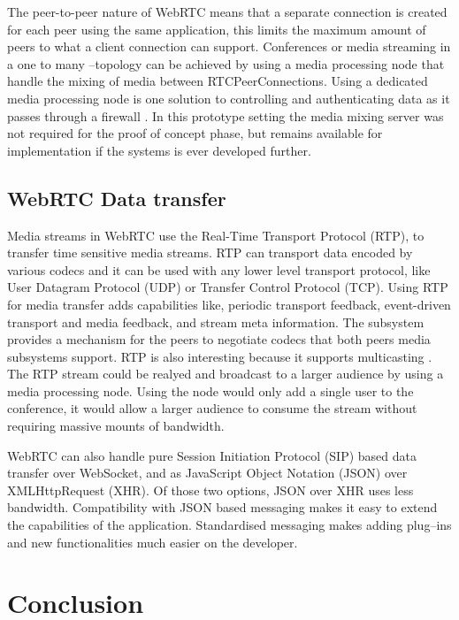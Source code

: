 \documentclass[english,12pt,a4paper,pdftex]{article}
\begin{document}
The peer-to-peer nature of WebRTC means that a separate connection is created for each peer using the same application, this limits the maximum amount of peers to what a client connection can support. Conferences or media streaming in a one to many --topology can be achieved by using a media processing node that handle the mixing of media between RTCPeerConnections. \cite{Jennings} Using a dedicated media processing node is one solution to controlling and authenticating data as it passes through a firewall \cite{Johnston}. In this prototype setting the media mixing server was not required for the proof of concept phase, but remains available for implementation if the systems is ever developed further. 

\subsection{WebRTC Data transfer}

Media streams in WebRTC use the Real-Time Transport Protocol (RTP), to transfer time sensitive media streams. RTP can transport data encoded by various codecs and it can be used with any lower level transport protocol, like User Datagram Protocol (UDP) or Transfer Control Protocol (TCP). Using RTP for media transfer adds capabilities like, periodic transport feedback, event-driven transport and media feedback, and stream meta information. The subsystem provides a mechanism for the peers to negotiate codecs that both peers media subsystems support. \cite{Jennings} \cite{Johnston} \cite{Frederick} RTP is also interesting because it supports multicasting \cite{Frederick}. The RTP stream could be realyed and broadcast to a larger audience by using a media processing node. Using the node would only add a single user to the conference, it would allow a larger audience to consume the stream without requiring massive mounts of bandwidth.

WebRTC can also handle pure Session Initiation Protocol (SIP) based data transfer over WebSocket, and as JavaScript Object Notation (JSON) over XMLHttpRequest (XHR). Of those two options, JSON over XHR uses less bandwidth. \cite{Adeyeye} Compatibility with JSON based messaging makes it easy to extend the capabilities of the application. Standardised messaging makes adding plug--ins and new functionalities much easier on the developer.


\clearpage


\section{Conclusion}
\end{document}
